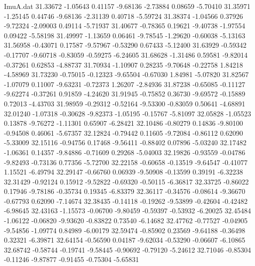 \begin{filecontents}{ImuA.dat}
  31.33672   -1.05643    0.41157   -9.68136   -2.73884    0.08659   -5.70410
  31.35971   -1.25145    0.44746   -9.68136   -2.31139    0.40718   -5.59724
  31.38374   -1.04566    0.37926   -9.72324   -2.09003    0.49114   -5.71937
  31.40677   -0.78365    0.19621   -9.40738   -1.97554    0.09422   -5.58198
  31.49997   -1.13659    0.06461   -9.78545   -1.29620   -0.60038   -5.13163
  31.56958   -0.43071    0.17587   -9.57967   -0.53290    0.67433   -5.12400
  31.63929   -0.59342   -0.17707   -9.60718   -0.83059   -0.59275   -6.24605
  31.68628   -1.31486    0.59581   -9.82014   -0.37261    0.62853   -4.88737
  31.70934   -1.10907    0.28235   -9.70648   -0.22758    1.84218   -4.58969
  31.73230   -0.75015   -0.12323   -9.65504   -0.67030    1.84981   -5.07820
  31.82567   -1.07079    0.11007   -9.63231   -0.72373    1.26207   -2.84936
  31.87238   -0.65085   -0.11127   -9.62274   -0.37261    0.91859   -4.24620
  31.91945   -0.75852    0.36730   -9.69572   -0.15889    0.72013   -4.43703
  31.98959   -0.29312   -0.52164   -9.53300   -0.83059    0.50641   -4.68891
  32.01240   -1.07318   -0.30628   -9.82373   -1.05195   -0.15767   -5.81097
  32.05828   -1.05523    0.13878   -9.76272   -1.11301    0.65907   -6.28421
  32.10486   -0.80279    0.14836   -9.80100   -0.94508    0.46061   -5.67357
  32.12824   -0.79442    0.11605   -9.72084   -0.86112    0.62090   -5.33009
  32.15116   -0.94756    0.17468   -9.56411   -0.88402    0.07896   -5.03240
  32.17482   -1.06361    0.14357   -9.84886   -0.71609    0.29268   -5.04003
  32.19826   -0.93559   -0.04786   -9.82493   -0.73136    0.77356   -5.72700
  32.22158   -0.60658   -0.13519   -9.64547   -0.41077    1.15521   -6.49794
  32.29147   -0.66760    0.06939   -9.50908   -0.13599    0.39191   -6.32238
  32.31429   -0.92124    0.15912   -9.52822   -0.69320   -0.50115   -6.36817
  32.33725   -0.86022    0.17946   -9.78186   -0.35734    0.19345   -6.83379
  32.36117   -0.34576   -0.08614   -9.36670   -0.67793    0.62090   -7.14674
  32.38435   -0.14118   -0.19262   -9.53899   -0.42604   -0.42482   -6.98645
  32.43163   -1.15573   -0.06700   -9.80459   -0.59397   -0.53932   -6.20025
  32.45484   -1.06122   -0.06820   -9.93620   -0.83822    0.73540   -6.14682
  32.47762   -0.77527   -0.04905   -9.54856   -1.09774    0.84989   -6.00179
  32.59474   -0.85902    0.23569   -9.64188   -0.36498    0.32321   -6.39871
  32.64154   -0.56590    0.04187   -9.62034   -0.53290   -0.06607   -6.10865
  32.68742   -0.58744   -0.19741   -9.58445   -0.90692   -0.79120   -5.24612
  32.71046   -0.85304   -0.11246   -9.87877   -0.91455   -0.75304   -5.65831

\end{filecontents}
